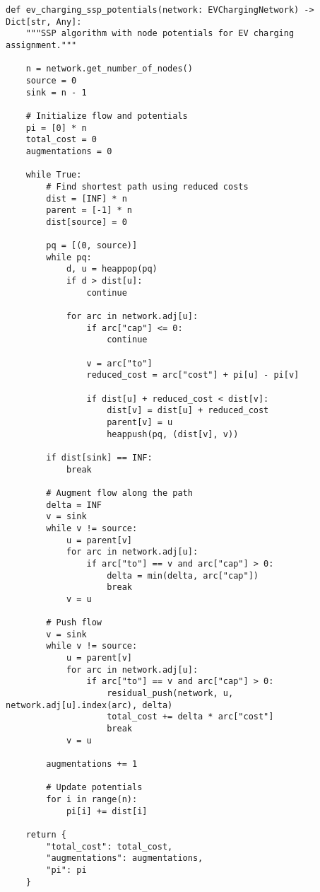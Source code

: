 \documentclass[12pt,a4paper]{article}
\begin{document}
\begin{lstlisting}[caption=Successive Shortest Path with Potentials]
def ev_charging_ssp_potentials(network: EVChargingNetwork) -> Dict[str, Any]:
    """SSP algorithm with node potentials for EV charging assignment."""
    
    n = network.get_number_of_nodes()
    source = 0
    sink = n - 1
    
    # Initialize flow and potentials
    pi = [0] * n
    total_cost = 0
    augmentations = 0
    
    while True:
        # Find shortest path using reduced costs
        dist = [INF] * n
        parent = [-1] * n
        dist[source] = 0
        
        pq = [(0, source)]
        while pq:
            d, u = heappop(pq)
            if d > dist[u]:
                continue
                
            for arc in network.adj[u]:
                if arc["cap"] <= 0:
                    continue
                    
                v = arc["to"]
                reduced_cost = arc["cost"] + pi[u] - pi[v]
                
                if dist[u] + reduced_cost < dist[v]:
                    dist[v] = dist[u] + reduced_cost
                    parent[v] = u
                    heappush(pq, (dist[v], v))
        
        if dist[sink] == INF:
            break
            
        # Augment flow along the path
        delta = INF
        v = sink
        while v != source:
            u = parent[v]
            for arc in network.adj[u]:
                if arc["to"] == v and arc["cap"] > 0:
                    delta = min(delta, arc["cap"])
                    break
            v = u
            
        # Push flow
        v = sink
        while v != source:
            u = parent[v]
            for arc in network.adj[u]:
                if arc["to"] == v and arc["cap"] > 0:
                    residual_push(network, u, network.adj[u].index(arc), delta)
                    total_cost += delta * arc["cost"]
                    break
            v = u
            
        augmentations += 1
        
        # Update potentials
        for i in range(n):
            pi[i] += dist[i]
    
    return {
        "total_cost": total_cost,
        "augmentations": augmentations,
        "pi": pi
    }
\end{lstlisting}
\end{document}
